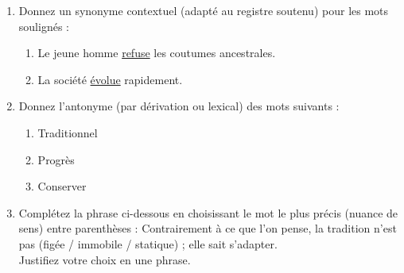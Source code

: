 \documentclass[11pt]{article}
\begin{document}
\begin{exercice}
\begin{enumerate}
    \item Donnez un synonyme contextuel (adapté au registre soutenu) pour les mots soulignés :
    \begin{enumerate}
        \item Le jeune homme \underline{refuse} les coutumes ancestrales.
        \item La société \underline{évolue} rapidement.
    \end{enumerate}
    \item Donnez l'antonyme (par dérivation ou lexical) des mots suivants :
    \begin{enumerate}
        \item Traditionnel
        \item Progrès
        \item Conserver
    \end{enumerate}
    \item Complétez la phrase ci-dessous en choisissant le mot le plus précis (nuance de sens) entre parenthèses :
    \og Contrairement à ce que l'on pense, la tradition n'est pas \underline{\hspace{2cm}} (figée / immobile / statique) ; elle sait s'adapter. \fg \\
    Justifiez votre choix en une phrase.
\end{enumerate}
\end{exercice}
\end{document}
